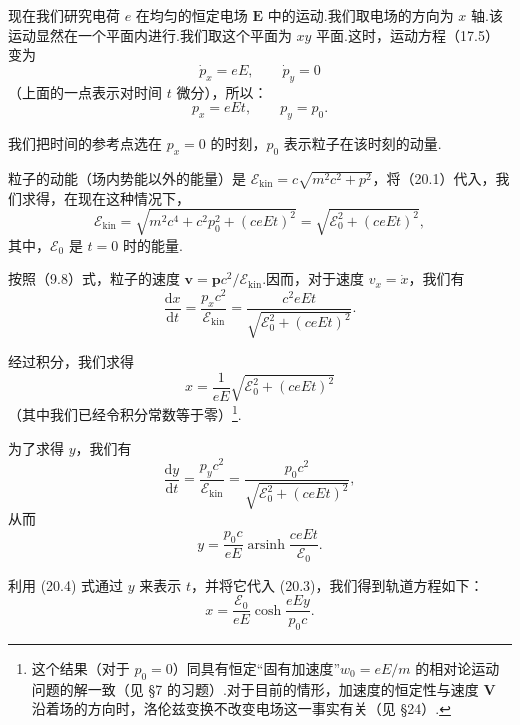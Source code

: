 现在我们研究电荷 $e$ 在均匀的恒定电场 $\boldsymbol{E}$ 中的运动.我们取电场的方向为 $x$ 轴.该运动显然在一个平面内进行.我们取这个平面为 $xy$ 平面.这时，运动方程（17.5）变为
\begin{equation*}
  \dot{p}_x=eE,\qquad \dot{p}_y=0
\end{equation*}
（上面的一点表示对时间 $t$ 微分），所以：
\begin{equation}
  p_x=eEt,\qquad p_y=p_0.
\end{equation}

我们把时间的参考点选在 $p_x=0$ 的时刻，$p_0$ 表示粒子在该时刻的动量.

粒子的动能（场内势能以外的能量）是
$\mathcal{E}_\mathrm{kin}=c\sqrt{m^2c^2+p^2}$，将（20.1）代入，我们求得，在现在这种情况下，
\begin{equation}
  \mathcal{E}_\mathrm{kin}
  =\sqrt{m^2c^4+c^2p_0^2+(ceEt)^2}
  =\sqrt{\mathcal{E}_0^2+(ceEt)^2},
\end{equation}
其中，$\mathcal{E}_0$ 是 $t=0$ 时的能量.

按照（9.8）式，粒子的速度 $\boldsymbol{v}=\boldsymbol{p}c^2/\mathcal{E}_\mathrm{kin}$.因而，对于速度
$v_x=\dot{x}$，我们有
\begin{equation*}
  \frac{\mathrm{d}x}{\mathrm{d}t}
  =\frac{p_xc^2}{\mathcal{E}_\mathrm{kin}}
  =\frac{c^2eEt}{\sqrt{\mathcal{E}_0^2+(ceEt)^2}}.
\end{equation*}

经过积分，我们求得
\begin{equation}
  x=\frac{1}{eE}\sqrt{\mathcal{E}_0^2+(ceEt)^2}
\end{equation}
（其中我们已经令积分常数等于零）\footnote{这个结果（对于 $p_0=0$）同具有恒定“固有加速度”$w_0=eE/m$ 的相对论运动问题的解一致（见 §7 的习题）.对于目前的情形，加速度的恒定性与速度 $\boldsymbol{V}$ 沿着场的方向时，洛伦兹变换不改变电场这一事实有关（见 §24）.}.

为了求得 $y$，我们有
\begin{equation*}
  \frac{\mathrm{d}y}{\mathrm{d}t}
  =\frac{p_yc^2}{\mathcal{E}_\mathrm{kin}}
  =\frac{p_0c^2}{\sqrt{\mathcal{E}_0^2+(ceEt)^2}},
\end{equation*}
从而
\begin{equation}
  y=\frac{p_0c}{eE}\operatorname{arsinh}\frac{ceEt}{\mathcal{E}_0}.
\end{equation}

利用 (20.4) 式通过 $y$ 来表示 $t$，并将它代入 (20.3)，我们得到轨道方程如下：
\begin{equation}
  x=\frac{\mathcal{E}_0}{eE}\cosh\frac{eEy}{p_0c}.
\end{equation}

